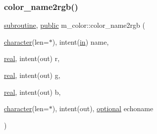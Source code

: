 \subsubsection{\texorpdfstring{color\+\_\+name2rgb()}{color\_name2rgb()}}
{\footnotesize\ttfamily \hyperlink{M__stopwatch_83_8txt_acfbcff50169d691ff02d4a123ed70482}{subroutine}, \hyperlink{M__stopwatch_83_8txt_a2f74811300c361e53b430611a7d1769f}{public} m\+\_\+color\+::color\+\_\+name2rgb (\begin{DoxyParamCaption}\item[{\hyperlink{option__stopwatch_83_8txt_abd4b21fbbd175834027b5224bfe97e66}{character}(len=$\ast$), intent(\hyperlink{M__journal_83_8txt_afce72651d1eed785a2132bee863b2f38}{in})}]{name,  }\item[{\hyperlink{read__watch_83_8txt_abdb62bde002f38ef75f810d3a905a823}{real}, intent(out)}]{r,  }\item[{\hyperlink{read__watch_83_8txt_abdb62bde002f38ef75f810d3a905a823}{real}, intent(out)}]{g,  }\item[{\hyperlink{read__watch_83_8txt_abdb62bde002f38ef75f810d3a905a823}{real}, intent(out)}]{b,  }\item[{\hyperlink{option__stopwatch_83_8txt_abd4b21fbbd175834027b5224bfe97e66}{character}(len=$\ast$), intent(out), \hyperlink{option__stopwatch_83_8txt_aa4ece75e7acf58a4843f70fe18c3ade5}{optional}}]{echoname }\end{DoxyParamCaption})}


